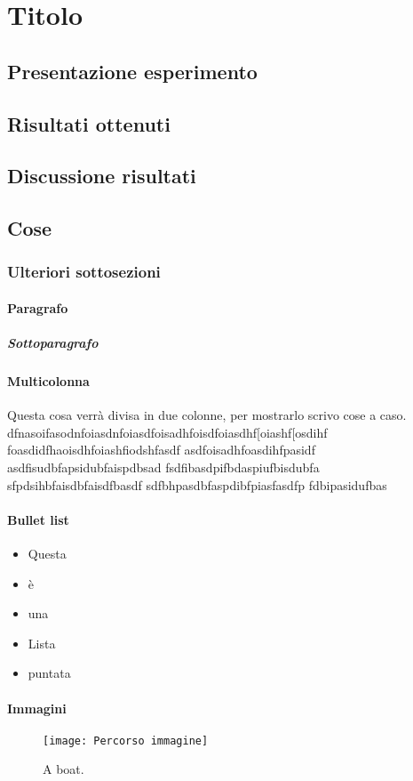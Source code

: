 \section*{Titolo}

	\subsection*{Presentazione esperimento}
	
	\subsection*{Risultati ottenuti}

	\subsection*{Discussione risultati}

	\subsection*{Cose}

	\subsubsection*{Ulteriori sottosezioni}

		\paragraph*{Paragrafo}

			\subparagraph*{Sottoparagrafo}

		\paragraph*{Multicolonna}
		\begin{multicols}{2}
			Questa cosa verr\`a divisa in due colonne, per mostrarlo scrivo cose a caso.
			dfnasoifasodnfoiasdnfoiasdfoisadhfoisdfoiasdhf[oiashf[osdihf
			foasdidfhaoisdhfoiashfiodshfasdf
			asdfoisadhfoasdihfpasidf
			asdfisudbfapsidubfaispdbsad
			fsdfibasdpifbdaspiufbisdubfa
			sfpdsihbfaisdbfaisdfbasdf
			sdfbhpasdbfaspdibfpiasfasdfp
			fdbipasidufbas
		\end{multicols}

		\paragraph*{Bullet list}
		\begin{itemize}
			\item Questa
			\item \`e
			\item una 
			\item Lista 
			\item puntata
		\end{itemize}

		\paragraph{Immagini}
		\begin{figure}
			  \texttt{[image: Percorso immagine]}
			    \caption{A boat.}
		   \end{figure}

